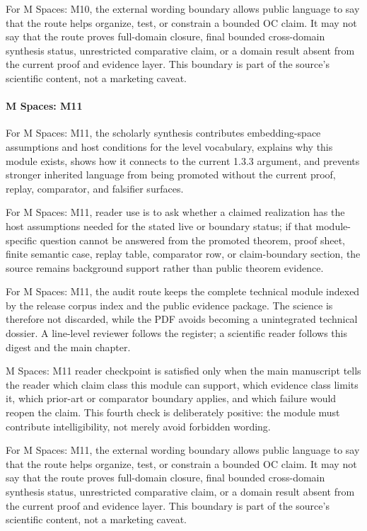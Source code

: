 For M Spaces: M10, the external wording boundary allows public language to say that the route helps organize, test, or constrain a bounded OC claim. It may not say that the route proves full-domain closure, final bounded cross-domain synthesis status, unrestricted comparative claim, or a domain result absent from the current proof and evidence layer. This boundary is part of the source's scientific content, not a marketing caveat.


\paragraph{M Spaces: M11}

For M Spaces: M11, the scholarly synthesis contributes embedding-space assumptions and host conditions for the level vocabulary, explains why this module exists, shows how it connects to the current 1.3.3 argument, and prevents stronger inherited language from being promoted without the current proof, replay, comparator, and falsifier surfaces.


For M Spaces: M11, reader use is to ask whether a claimed realization has the host assumptions needed for the stated live or boundary status; if that module-specific question cannot be answered from the promoted theorem, proof sheet, finite semantic case, replay table, comparator row, or claim-boundary section, the source remains background support rather than public theorem evidence.


For M Spaces: M11, the audit route keeps the complete technical module indexed by the release corpus index and the public evidence package. The science is therefore not discarded, while the PDF avoids becoming a unintegrated technical dossier. A line-level reviewer follows the register; a scientific reader follows this digest and the main chapter.


M Spaces: M11 reader checkpoint is satisfied only when the main manuscript tells the reader which claim class this module can support, which evidence class limits it, which prior-art or comparator boundary applies, and which failure would reopen the claim. This fourth check is deliberately positive: the module must contribute intelligibility, not merely avoid forbidden wording.


For M Spaces: M11, the external wording boundary allows public language to say that the route helps organize, test, or constrain a bounded OC claim. It may not say that the route proves full-domain closure, final bounded cross-domain synthesis status, unrestricted comparative claim, or a domain result absent from the current proof and evidence layer. This boundary is part of the source's scientific content, not a marketing caveat.


